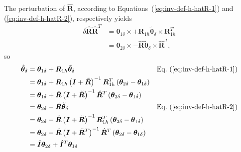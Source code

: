 \documentclass[10pt,fleqn,subeqn]{report}
\newcommand{\T}[1]{\bm{#1}}
\begin{document}
The perturbation of $\hat{\T{R}}$, according 
to Equations~(\ref{eq:inv-def-h-hatR-1}) and (\ref{eq:inv-def-h-hatR-2}),
respectively yields
\begin{align}
	\delta\hat{\T{R}} \hat{\T{R}}^T
	&= \T{\theta}_{1\delta} \times
		+ \T{R}_{1h} \tilde{\T{\theta}}_{\delta}\times \T{R}_{1h}^T \nonumber \\
	&= \T{\theta}_{2\delta} \times
		- \hat{\T{R}} \tilde{\T{\theta}}_{\delta}\times \hat{\T{R}}^T ,
\end{align}
so
\begin{align}
	\hat{\T{\theta}}_{\delta}
	&= \T{\theta}_{1\delta}
		+ \T{R}_{1h} \tilde{\T{\theta}}_{\delta}
		&& \text{Eq.~(\ref{eq:inv-def-h-hatR-1})} \nonumber \\
	&= \T{\theta}_{1\delta}
		+ \T{R}_{1h} \plbr{\T{I} + \tilde{\T{R}}}^{-1}
		\T{R}_{1h}^T \plbr{\T{\theta}_{2\delta} - \T{\theta}_{1\delta}} \nonumber \\
	&= \T{\theta}_{1\delta}
		+ \hat{\T{R}} \plbr{\T{I} + \tilde{\T{R}}}^{-1}
		\hat{\T{R}}^T \plbr{\T{\theta}_{2\delta} - \T{\theta}_{1\delta}} \nonumber \\
	&= \T{\theta}_{2\delta}
		- \hat{\T{R}} \tilde{\T{\theta}}_{\delta}
		&& \text{Eq.~(\ref{eq:inv-def-h-hatR-2})} \nonumber \\
	&= \T{\theta}_{2\delta}
		- \hat{\T{R}} \plbr{\T{I} + \tilde{\T{R}}}^{-1}
		\T{R}_{1h}^T \plbr{\T{\theta}_{2\delta} - \T{\theta}_{1\delta}} \nonumber \\
	&= \T{\theta}_{2\delta}
		- \hat{\T{R}} \plbr{\T{I} + \tilde{\T{R}}^T}^{-1}
		\hat{\T{R}}^T \plbr{\T{\theta}_{2\delta} - \T{\theta}_{1\delta}} \nonumber \\
	&= \hat{\T{I}} \T{\theta}_{2\delta}
		+ \hat{\T{I}}^T \T{\theta}_{1\delta}
\end{align}
\end{document}

